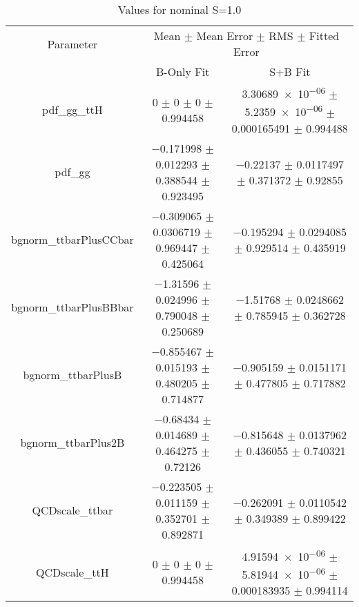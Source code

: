\begin{table}
\centering
\caption{Values for nominal S=1.0}
\begin{tabular}{ccc}
\toprule
Parameter & \multicolumn{2}{c}{Mean $\pm$ Mean Error $\pm$ RMS $\pm$ Fitted Error}\\
 & B-Only Fit & S+B Fit\\
\midrule
pdf\_gg\_ttH & \num{0} $\pm$ \num{0} $\pm$ \num{0} $\pm$ \num{0.994458} & \num{3.30689e-06} $\pm$ \num{5.2359e-06} $\pm$ \num{0.000165491} $\pm$ \num{0.994488}\\
pdf\_gg & \num{-0.171998} $\pm$ \num{0.012293} $\pm$ \num{0.388544} $\pm$ \num{0.923495} & \num{-0.22137} $\pm$ \num{0.0117497} $\pm$ \num{0.371372} $\pm$ \num{0.92855}\\
bgnorm\_ttbarPlusCCbar & \num{-0.309065} $\pm$ \num{0.0306719} $\pm$ \num{0.969447} $\pm$ \num{0.425064} & \num{-0.195294} $\pm$ \num{0.0294085} $\pm$ \num{0.929514} $\pm$ \num{0.435919}\\
bgnorm\_ttbarPlusBBbar & \num{-1.31596} $\pm$ \num{0.024996} $\pm$ \num{0.790048} $\pm$ \num{0.250689} & \num{-1.51768} $\pm$ \num{0.0248662} $\pm$ \num{0.785945} $\pm$ \num{0.362728}\\
bgnorm\_ttbarPlusB & \num{-0.855467} $\pm$ \num{0.015193} $\pm$ \num{0.480205} $\pm$ \num{0.714877} & \num{-0.905159} $\pm$ \num{0.0151171} $\pm$ \num{0.477805} $\pm$ \num{0.717882}\\
bgnorm\_ttbarPlus2B & \num{-0.68434} $\pm$ \num{0.014689} $\pm$ \num{0.464275} $\pm$ \num{0.72126} & \num{-0.815648} $\pm$ \num{0.0137962} $\pm$ \num{0.436055} $\pm$ \num{0.740321}\\
QCDscale\_ttbar & \num{-0.223505} $\pm$ \num{0.011159} $\pm$ \num{0.352701} $\pm$ \num{0.892871} & \num{-0.262091} $\pm$ \num{0.0110542} $\pm$ \num{0.349389} $\pm$ \num{0.899422}\\
QCDscale\_ttH & \num{0} $\pm$ \num{0} $\pm$ \num{0} $\pm$ \num{0.994458} & \num{4.91594e-06} $\pm$ \num{5.81944e-06} $\pm$ \num{0.000183935} $\pm$ \num{0.994114}\\
\bottomrule
\end{tabular}
\end{table}